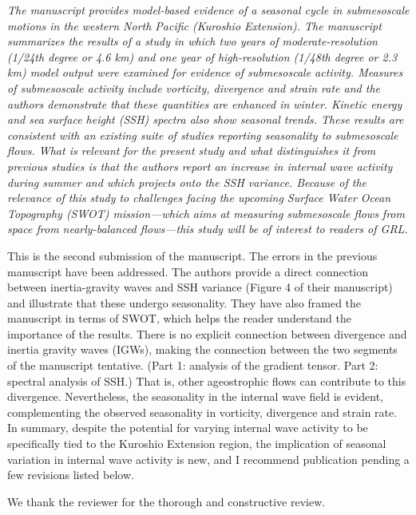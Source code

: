 \documentclass[11pt]{article}
\newcommand{\bdp}{\begin{description}}
\newcommand{\edp}{\end{description}}
\begin{document}
{\it The manuscript provides model-based evidence of a seasonal cycle in submesoscale motions
in the western North Pacific (Kuroshio Extension). The manuscript summarizes the results of
a study in which two years of moderate-resolution (1/24th degree or 4.6 km) and one year of
high-resolution (1/48th degree or 2.3 km) model output were examined for evidence of
submesoscale activity. Measures of submesoscale activity include vorticity, divergence and
strain rate and the authors demonstrate that these quantities are enhanced in winter. Kinetic
energy and sea surface height (SSH) spectra also show seasonal trends. These results are
consistent with an existing suite of studies reporting seasonality to submesoscale flows. What
is relevant for the present study and what distinguishes it from previous studies is that the
authors report an increase in internal wave activity during summer and which projects onto
the SSH variance. Because of the relevance of this study to challenges facing the upcoming
Surface Water Ocean Topography (SWOT) mission—which aims at measuring submesoscale
flows from space from nearly-balanced flows—this study will be of interest to readers of
GRL.


This is the second submission of the manuscript. The errors in the previous manuscript have
been addressed. The authors provide a direct connection between inertia-gravity waves and
SSH variance (Figure 4 of their manuscript) and illustrate that these undergo seasonality.
They have also framed the manuscript in terms of SWOT, which helps the reader understand
the importance of the results. There is no explicit connection between divergence and inertia gravity
waves (IGWs), making the connection between the two segments of the manuscript
tentative. (Part 1: analysis of the gradient tensor. Part 2: spectral analysis of SSH.) That is,
other ageostrophic flows can contribute to this divergence. Nevertheless, the seasonality in the
internal wave field is evident, complementing the observed seasonality in vorticity,
divergence and strain rate. In summary, despite the potential for varying internal wave
activity to be specifically tied to the Kuroshio Extension region, the implication of seasonal
variation in internal wave activity is new, and I recommend publication pending a few
revisions listed below.}

\bdp
   \item We thank the reviewer for the thorough and constructive review.
\edp
\end{document}
